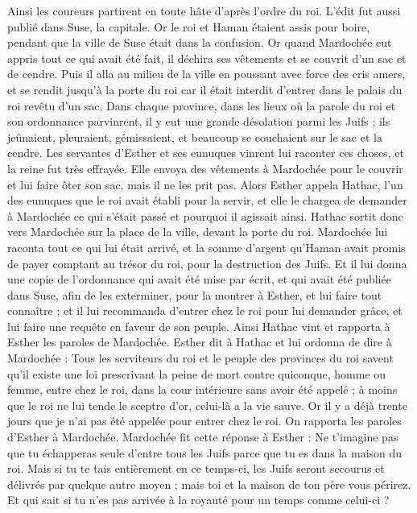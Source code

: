 \begin{multicols}{2}
Ainsi les coureurs partirent en toute hâte d’après l’ordre du roi. L'édit fut aussi publié dans Suse, la capitale. Or le roi et Haman étaient assis pour boire, pendant que la ville de Suse était dans la confusion.
\VerseOne{}Or quand Mardochée eut appris tout ce qui avait été fait, il déchira ses vêtements et se couvrit d'un sac et de cendre. Puis il alla au milieu de la ville en poussant avec force des cris amers,
et se rendit jusqu'à la porte du roi car il était interdit d'entrer dans le palais du roi revêtu d'un sac.
Dans chaque province, dans les lieux où la parole du roi et son ordonnance parvinrent, il y eut une grande désolation parmi les Juifs ; ils jeûnaient, pleuraient, gémissaient, et beaucoup se couchaient sur le sac et la cendre.
Les servantes d'Esther et ses eunuques vinrent lui raconter ces choses, et la reine fut très effrayée. Elle envoya des vêtements à Mardochée pour le couvrir et lui faire ôter son sac, mais il ne les prit pas.
Alors Esther appela Hathac, l'un des eunuques que le roi avait établi pour la servir, et elle le chargea de demander à Mardochée ce qui s’était passé et pourquoi il agissait ainsi.
Hathac sortit donc vers Mardochée sur la place de la ville, devant la porte du roi.
Mardochée lui raconta tout ce qui lui était arrivé, et la somme d'argent qu'Haman avait promis de payer comptant au trésor du roi, pour la destruction des Juifs.
Et il lui donna une copie de l’ordonnance qui avait été mise par écrit, et qui avait été publiée dans Suse, afin de les exterminer, pour la montrer à Esther, et lui faire tout connaître ; et il lui recommanda d'entrer chez le roi pour lui demander grâce, et lui faire une requête en faveur de son peuple.
Ainsi Hathac vint et rapporta à Esther les paroles de Mardochée.
Esther dit à Hathac et lui ordonna de dire à Mardochée :
Tous les serviteurs du roi et le peuple des provinces du roi savent qu'il existe une loi prescrivant la peine de mort contre quiconque, homme ou femme, entre chez le roi, dans la cour intérieure sans avoir été appelé ; à moins que le roi ne lui tende le sceptre d'or, celui-là a la vie sauve. Or il y a déjà trente jours que je n'ai pas été appelée pour entrer chez le roi.
On rapporta les paroles d'Esther à Mardochée.
Mardochée fit cette réponse à Esther : Ne t'imagine pas que tu échapperas seule d’entre tous les Juifs parce que tu es dans la maison du roi.
Mais si tu te tais entièrement en ce temps-ci, les Juifs seront secourus et délivrés par quelque autre moyen ; mais toi et la maison de ton père vous périrez. Et qui sait si tu n'es pas arrivée à la royauté pour un temps comme celui-ci ?

\end{multicols}
